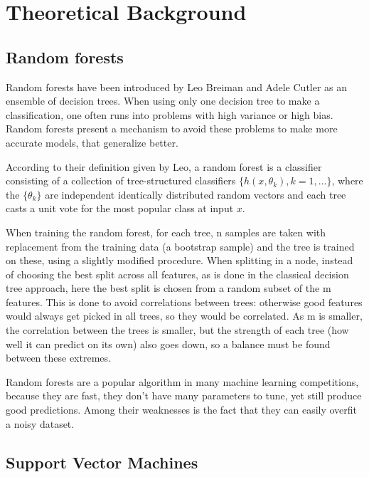 \section{Theoretical Background}

\subsection{Random forests}

Random forests have been introduced by Leo Breiman and Adele Cutler\cite{breiman2001random} as an ensemble of decision trees. When using only one decision tree to make a classification, one often runs into problems with high variance or high bias. Random forests present a mechanism to avoid these problems to make more accurate models, that generalize better. 

According to their definition given by Leo, a random forest is a classifier consisting of a collection of tree-structured classifiers $ \{h(x, \theta_k), k=1, ... \} $, where the $ \{ \theta_k \} $ are independent identically distributed random vectors and each tree casts a unit vote for the most popular class at input $ x $.


When training the random forest, for each tree, n samples are taken with replacement from the training data (a bootstrap sample) and the tree is trained on these, using a slightly modified procedure. When splitting in a node, instead of choosing the best split across all features, as is done in the classical decision tree approach, here the best split is chosen from a random subset of the m features. This is done to avoid correlations between trees: otherwise good features would always get picked in all trees, so they would be correlated. As m is smaller, the correlation between the trees is smaller, but the strength of each tree (how well it can predict on its own) also goes down, so a balance must be found between these extremes. 

Random forests are a popular algorithm in many machine learning competitions, because they are fast, they don't have many parameters to tune, yet still produce good predictions. Among their weaknesses is the fact that they can easily overfit a noisy dataset. 

\subsection{Support Vector Machines}

